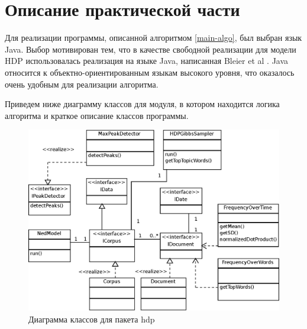 \documentclass[12pt, a4paper]{article}
\newcommand\todo[1]{\marginpar{\textcolor{red}{#1}}}
\begin{document}
	\section{Описание практической части}
Для реализации программы, описанной алгоритмом \ref{main-algo}, был выбран язык Java. Выбор мотивирован тем, что в качестве свободной реализации для модели HDP использовалась реализация на языке Java, написанная Bleier et al \cite{hdp-2}. Java относится к объектно-ориентированным языкам высокого уровня, что оказалось очень удобным для реализации алгоритма.	
	
	Приведем ниже диаграмму классов для модуля, в котором находится логика алгоритма и краткое описание классов программы.	
	
	\begin{figure}[H]
	\centering
	\includegraphics[width=15cm]{ClassDiagramHDP.eps}	
	\caption{Диаграмма классов для пакета hdp}
	\end{figure}	
	
\end{document}
